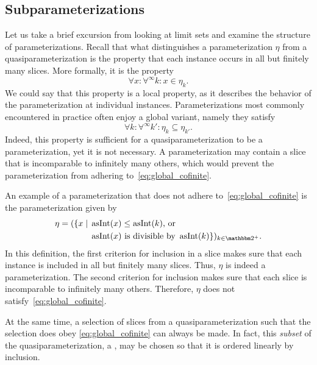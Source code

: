 \subsection{Subparameterizations}
\label{sec:computability:subparameterizations}%
Let us take a brief excursion from looking at limit sets and examine the structure of parameterizations.
Recall that what distinguishes a parameterization $\eta$ from a quasiparameterization is the property that each instance occurs in all but finitely many slices.
More formally, it is the property
\begin{equation*}
  \forall x\colon \forall^\infty k\colon x \in \eta_k.
\end{equation*}
We could say that this property is a local property, as it describes the behavior of the parameterization at individual instances.
Parameterizations most commonly encountered in practice \parencite{niedermeier2006invitation} often enjoy a global variant, namely they satisfy
\begin{equation}
\label{eq:global_cofinite}
  \forall k\colon \forall^\infty k'\colon \eta_k \subseteq \eta_{k'}.
\end{equation}
Indeed, this property is sufficient for a quasiparameterization to be a parameterization, yet it is not necessary.
A parameterization may contain a slice that is incomparable to infinitely many others, which would prevent the parameterization from adhering to~\eqref{eq:global_cofinite}.
\begin{example}
  An example of a parameterization that does not adhere to~\eqref{eq:global_cofinite} is the parameterization given by
  \begin{align*}
    \eta \deq (\{x \st &\asNat(x) \le \asNat(k)\text{, or} \\
    	&\asNat(x)\text{ is divisible by }\asNat(k)\})_{k \in \binary^+}.
  \end{align*}
  In this definition, the first criterion for inclusion in a slice makes sure that each instance is included in all but finitely many slices.
  Thus, $\eta$ is indeed a parameterization.
  The second criterion for inclusion makes sure that each slice is incomparable to infinitely many others.
  Therefore, $\eta$ does not satisfy~\eqref{eq:global_cofinite}.
\end{example}
At the same time, a selection of slices from a quasiparameterization such that the selection does obey \eqref{eq:global_cofinite} can always be made.
In fact, this \emph{subset} of the quasiparameterization, a , may be chosen so that it is ordered linearly by inclusion.
